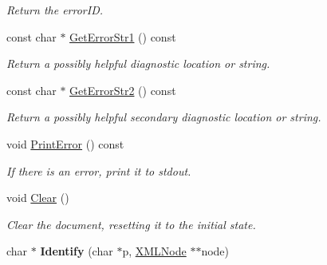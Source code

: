 \begin{DoxyCompactItemize}
\begin{DoxyCompactList}\small\item\em Return the error\-I\-D. \end{DoxyCompactList}\item 
\hypertarget{classtinyxml2_1_1_x_m_l_document_a016ccebecee36fe92084b5dfee6cc072}{const char $\ast$ \hyperlink{classtinyxml2_1_1_x_m_l_document_a016ccebecee36fe92084b5dfee6cc072}{Get\-Error\-Str1} () const }\label{classtinyxml2_1_1_x_m_l_document_a016ccebecee36fe92084b5dfee6cc072}

\begin{DoxyCompactList}\small\item\em Return a possibly helpful diagnostic location or string. \end{DoxyCompactList}\item 
\hypertarget{classtinyxml2_1_1_x_m_l_document_a88f6b44bd019033bda28abd31fe257b2}{const char $\ast$ \hyperlink{classtinyxml2_1_1_x_m_l_document_a88f6b44bd019033bda28abd31fe257b2}{Get\-Error\-Str2} () const }\label{classtinyxml2_1_1_x_m_l_document_a88f6b44bd019033bda28abd31fe257b2}

\begin{DoxyCompactList}\small\item\em Return a possibly helpful secondary diagnostic location or string. \end{DoxyCompactList}\item 
\hypertarget{classtinyxml2_1_1_x_m_l_document_a7545cc9a9a67eee9307c001aa316a388}{void \hyperlink{classtinyxml2_1_1_x_m_l_document_a7545cc9a9a67eee9307c001aa316a388}{Print\-Error} () const }\label{classtinyxml2_1_1_x_m_l_document_a7545cc9a9a67eee9307c001aa316a388}

\begin{DoxyCompactList}\small\item\em If there is an error, print it to stdout. \end{DoxyCompactList}\item 
\hypertarget{classtinyxml2_1_1_x_m_l_document_a65656b0b2cbc822708eb351504178aaf}{void \hyperlink{classtinyxml2_1_1_x_m_l_document_a65656b0b2cbc822708eb351504178aaf}{Clear} ()}\label{classtinyxml2_1_1_x_m_l_document_a65656b0b2cbc822708eb351504178aaf}

\begin{DoxyCompactList}\small\item\em Clear the document, resetting it to the initial state. \end{DoxyCompactList}\item 
\hypertarget{classtinyxml2_1_1_x_m_l_document_a25827d1bec509ad566a107e5853ed040}{char $\ast$ {\bfseries Identify} (char $\ast$p, \hyperlink{classtinyxml2_1_1_x_m_l_node}{X\-M\-L\-Node} $\ast$$\ast$node)}\label{classtinyxml2_1_1_x_m_l_document_a25827d1bec509ad566a107e5853ed040}


\end{DoxyCompactItemize}
